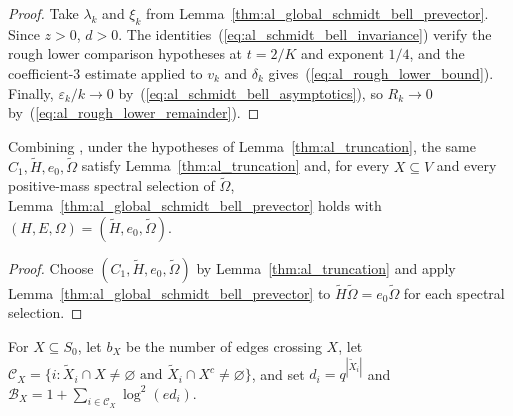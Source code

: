 \begin{proof}\leanok
    Take $\lambda_k$ and $\xi_k$ from
    Lemma~\ref{thm:al_global_schmidt_bell_prevector}. Since $z>0$, $d>0$. The
    identities~(\ref{eq:al_schmidt_bell_invariance}) verify the rough lower
    comparison hypotheses at $t=2/K$ and exponent $1/4$, and the coefficient-$3$
    estimate applied to $v_k$ and $\delta_k$ gives~(\ref{eq:al_rough_lower_bound}).
    Finally, $\varepsilon_k/k\to0$ by~(\ref{eq:al_schmidt_bell_asymptotics}), so
    $R_k\to0$ by~(\ref{eq:al_rough_lower_remainder}).
\end{proof}

\begin{lemma}
    \label{thm:al_truncation_schmidt_bell_prevector}
    \leanok
    Combining \cite[Sections~4 and~8]{OpenAI2026AreaLaw}, under the hypotheses
    of Lemma~\ref{thm:al_truncation}, the same $C_1,\widetilde H,e_0,\widetilde\Omega$
    satisfy Lemma~\ref{thm:al_truncation} and, for every $X\subseteq V$ and
    every positive-mass spectral selection of $\widetilde\Omega$,
    Lemma~\ref{thm:al_global_schmidt_bell_prevector} holds with
    $(H,E,\Omega)=(\widetilde H,e_0,\widetilde\Omega)$.
\end{lemma}
\begin{proof}\leanok
    Choose $(C_1,\widetilde H,e_0,\widetilde\Omega)$ by
    Lemma~\ref{thm:al_truncation} and apply
    Lemma~\ref{thm:al_global_schmidt_bell_prevector} to
    $\widetilde H\widetilde\Omega=e_0\widetilde\Omega$ for each spectral selection.
\end{proof}

For $X\subseteq S_0$, let $b_X$ be the number of edges crossing $X$, let
$\mathcal C_X=\{i:\widetilde X_i\cap X\ne\varnothing\text{ and }\widetilde X_i\cap X^c\ne\varnothing\}$,
and set $d_i=q^{|\widetilde X_i|}$ and
$\mathcal B_X=1+\sum_{i\in\mathcal C_X}\log^2(ed_i)$.

